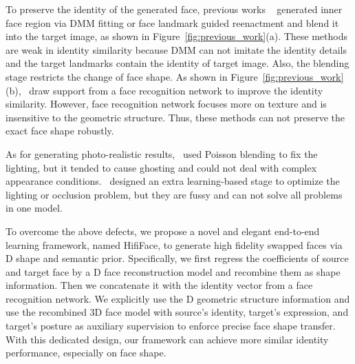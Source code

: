 \documentclass{article}
\begin{document}
To preserve the identity of the generated face, previous works ~\cite{nirkin2018face,Nirkin2019fsgan,jiang2020deeperforensics} generated inner face region via DMM fitting or face landmark guided reenactment and blend it into the target image, as shown in Figure~\ref{fig:previous_work}(a). These methods are weak in identity similarity because DMM can not imitate the identity details and the target landmarks contain the identity of target image. Also, the blending stage restricts the change of face shape. As shown in Figure~\ref{fig:previous_work}(b),~\cite{liu2019identity,chen2020simswap} draw support from a face recognition network to improve the identity similarity.
However, face recognition network focuses more on texture and is insensitive to the geometric structure. Thus, these methods can not preserve the exact face shape robustly.

As for generating photo-realistic results,~\cite{nirkin2018face,Nirkin2019fsgan} used Poisson blending to fix the lighting, but it tended to cause ghosting and could not deal with complex appearance conditions.~\cite{jiang2020deeperforensics,zhu2020aot,li2019faceshifter} designed an extra learning-based stage to optimize the lighting or occlusion problem, but they are fussy and can not solve all problems in one model. 

To overcome the above defects, we propose a novel and elegant end-to-end learning framework, named HifiFace, to generate high fidelity swapped faces via D shape and semantic prior. Specifically, we first regress the coefficients of source and target face by a D face reconstruction model and recombine them as shape information. Then we concatenate it with the identity vector from a face recognition network. We explicitly use the D geometric structure information and use the recombined 3D face model with source's identity, target's expression, and target's posture as auxiliary supervision to enforce precise face shape transfer. With this dedicated design, our framework can achieve more similar identity performance, especially on face shape.
\end{document}
